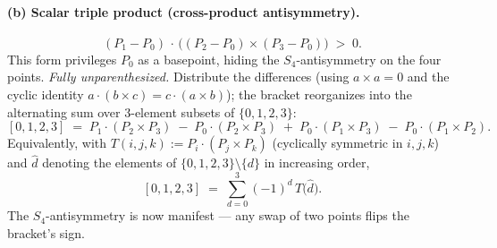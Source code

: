 \documentclass[11pt]{article}
\begin{document}
\paragraph{(b) Scalar triple product (cross-product antisymmetry).}
\[
(P_1 - P_0)\,\cdot\,\bigl((P_2 - P_0)\times(P_3 - P_0)\bigr) \;>\; 0.
\]
This form privileges $P_0$ as a basepoint, hiding the $S_4$-antisymmetry on the
four points. \emph{Fully unparenthesized.} Distribute the differences (using
$a\!\times\!a=0$ and the cyclic identity $a\!\cdot\!(b\!\times\!c)=c\!\cdot\!(a\!\times\!b)$);
the bracket reorganizes into the alternating sum over $3$-element subsets of
$\{0,1,2,3\}$:
\[
[0,1,2,3] \;=\; P_1\!\cdot\!(P_2\!\times\!P_3) \;-\; P_0\!\cdot\!(P_2\!\times\!P_3) \;+\; P_0\!\cdot\!(P_1\!\times\!P_3) \;-\; P_0\!\cdot\!(P_1\!\times\!P_2).
\]
Equivalently, with $T(i,j,k) := P_i\cdot(P_j\!\times\!P_k)$ (cyclically symmetric in
$i,j,k$) and $\widehat{d}$ denoting the elements of $\{0,1,2,3\}\setminus\{d\}$ in
increasing order,
\[
[0,1,2,3] \;=\; \sum_{d=0}^{3} (-1)^d\, T\!\bigl(\widehat{d}\bigr).
\]
The $S_4$-antisymmetry is now manifest --- any swap of two points flips the
bracket's sign.
\end{document}
